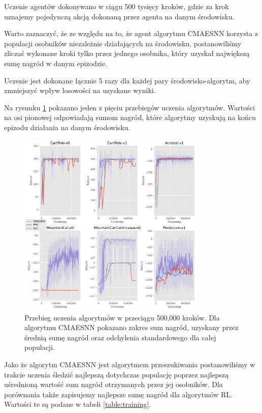 \documentclass[12pt,a4paper]{article}
\begin{document}
Uczenie agentów dokonywano w ciągu 500 tysięcy kroków,
gdzie za krok uznajemy pojedynczą akcją dokonaną przez
agenta na danym środowisku.

Warto zaznaczyć, że ze względu na to, że agent
algorytmu CMAESNN korzysta z populacji osobników niezależnie
działających na środowisku, postanowiliśmy zliczać wykonane kroki tylko
przez jednego osobnika, który uzyskał największą sumę nagród
w danym epizodzie.

Uczenie jest dokonane łącznie 5 razy dla każdej pary środowisko-algorytm,
aby zmniejszyć wpływ losowości na uzyskane wyniki.

Na rysunku \ref{fig:training} pokazano jeden z pięciu przebiegów uczenia
algorytmów. Wartości na osi pionowej odpowiadają sumom nagród,
które algorytmy uzyskują na końcu epizodu działania na danym środowisku.

\begin{figure}[!h]
  \centering
  \includegraphics[width=0.8\textwidth]{../plotting/plots/plot_all0.pdf}
  \caption{Przebieg uczenia algorytmów w przeciągu 500,000 kroków.
    Dla algorytmu CMAESNN pokazano zakres sum nagród, uzyskany przez
    średnią sumę nagród oraz odchylenia standardowego dla całej populacji.}
  \label{fig:training}
\end{figure}

Jako że algorytm CMAESNN jest algorytmem przeszukiwania postanowiliśmy w trakcie
uczenia śledzić najlepszą dotychczas populację poprzez najlepszą uśrednioną wartość
sum nagród otrzymanych przez jej osobników. Dla porównania także zapisujemy
najlepsze sumę nagród dla algorytmów RL. Wartości te są podane w tabeli
\ref{table:training}.
\end{document}
